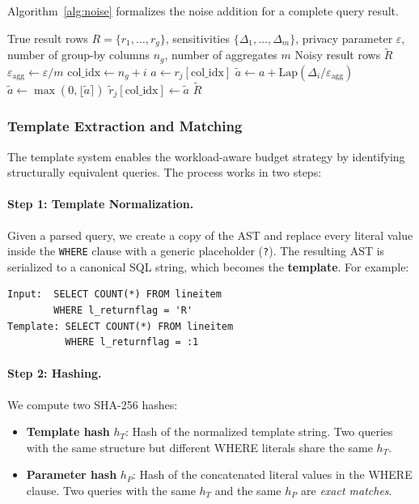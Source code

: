\documentclass[sigconf,nonacm]{acmart}
\begin{document}
Algorithm~\ref{alg:noise} formalizes the noise addition for a complete query result.

\begin{algorithm}[h]
\caption{Noise Addition for Aggregate Query Results}
\label{alg:noise}
\begin{algorithmic}[1]
\REQUIRE True result rows $R = \{r_1, \ldots, r_g\}$, sensitivities $\{\Delta_1, \ldots, \Delta_m\}$, privacy parameter $\varepsilon$, number of group-by columns $n_g$, number of aggregates $m$
\ENSURE Noisy result rows $\tilde{R}$
\STATE $\varepsilon_{\text{agg}} \leftarrow \varepsilon / m$ 
        \STATE $\text{col\_idx} \leftarrow n_g + i$ 
        \STATE $a \leftarrow r_j[\text{col\_idx}]$
        \STATE $\tilde{a} \leftarrow a + \text{Lap}(\Delta_i / \varepsilon_{\text{agg}})$
            \STATE $\tilde{a} \leftarrow \max(0, \lfloor \tilde{a} \rceil)$ 
        \ENDIF
        \STATE $\tilde{r}_j[\text{col\_idx}] \leftarrow \tilde{a}$
    \ENDFOR
\ENDFOR
\RETURN $\tilde{R}$
\end{algorithmic}
\end{algorithm}

\subsubsection{Template Extraction and Matching}

The template system enables the workload-aware budget strategy by identifying structurally equivalent queries. The process works in two steps:

\paragraph{Step 1: Template Normalization.} Given a parsed query, we create a copy of the AST and replace every literal value inside the \texttt{WHERE} clause with a generic placeholder (\texttt{?}). The resulting AST is serialized to a canonical SQL string, which becomes the \textbf{template}. For example:
\begin{verbatim}
Input:  SELECT COUNT(*) FROM lineitem
        WHERE l_returnflag = 'R'
Template: SELECT COUNT(*) FROM lineitem
          WHERE l_returnflag = :1
\end{verbatim}

\paragraph{Step 2: Hashing.} We compute two SHA-256 hashes:
\begin{itemize}
    \item \textbf{Template hash} $h_T$: Hash of the normalized template string. Two queries with the same structure but different WHERE literals share the same $h_T$.
    \item \textbf{Parameter hash} $h_P$: Hash of the concatenated literal values in the WHERE clause. Two queries with the same $h_T$ and the same $h_P$ are \emph{exact matches}.
\end{itemize}
\end{document}
